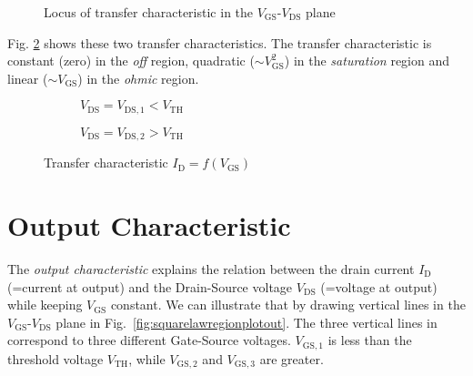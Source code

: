 \documentclass{article}[11pt]
\begin{document}
\begin{figure}[H]
  \centering
  \begin{tikzpicture}[scale=1.2]
    
  \end{tikzpicture}
  \caption{Locus of transfer characteristic in the $V_{\mathrm{GS}}$-$V_{\mathrm{DS}}$ plane}
  \label{fig:squarelawregionplottransf}
\end{figure}

Fig. \ref{fig:squarelawtransf} shows these two transfer characteristics.
The transfer characteristic is constant (zero) in the \textit{off} region,
quadratic ($\sim V_{\mathrm{GS}}^2$) in the \textit{saturation} region and 
linear ($\sim V_{\mathrm{GS}}$) in the \textit{ohmic} region.

\begin{figure}[H]
  \centering
  \begin{subfigure}[b]{0.475\textwidth}
      \centering
      \begin{tikzpicture}[scale=1.2]
        
      \end{tikzpicture}
      \caption{$V_{\mathrm{DS}}=V_{\mathrm{DS,1}} < V_{\mathrm{TH}}$}
  \end{subfigure}%
  \hfill
  \begin{subfigure}[b]{0.475\textwidth}
      \centering
      \begin{tikzpicture}[scale=1.2]
        
      \end{tikzpicture}
      \caption{$V_{\mathrm{DS}}=V_{\mathrm{DS,2}} > V_{\mathrm{TH}}$}
  \end{subfigure}
  \caption{Transfer characteristic $I_{\mathrm{D}} = f(V_{\mathrm{GS}})$}
  \label{fig:squarelawtransf}
\end{figure}

\section{Output Characteristic}

The \textit{output characteristic} explains the relation between the drain 
current $I_{\mathrm{D}}$ (=current at output) and the Drain-Source 
voltage $V_{\mathrm{DS}}$ (=voltage at output) while keeping 
$V_{\mathrm{GS}}$ constant.
We can illustrate that by drawing vertical lines in the 
$V_{\mathrm{GS}}$-$V_{\mathrm{DS}}$ plane in 
Fig.~\ref{fig:squarelawregionplotout}.
The three vertical lines in correspond to 
three different Gate-Source voltages.
$V_{\mathrm{GS,1}}$ is less than the threshold voltage 
$V_{\mathrm{TH}}$, while $V_{\mathrm{GS,2}}$ and 
$V_{\mathrm{GS,3}}$ are greater.
\end{document}

